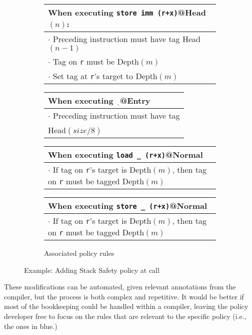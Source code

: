 \documentclass{report}
\begin{document}
\begin{figure}
\begin{subfigure}{\textwidth}
    \begin{tabular}{|l|}
      \hline
      When executing {\tt store imm (r+x)}@{\sc Head}\((n)\): \\
      \hline
      \rowcolor{red!20}
      \(\cdot\) Preceding instruction must have tag {\sc Head}\((n-1)\) \\
      \rowcolor{blue!30}
      \(\cdot\) Tag on {\tt r} must be {\sc Depth}\((m)\) \\
      \rowcolor{blue!30}
      \(\cdot\) Set tag at {\tt r}'s target to {\sc Depth}\((m)\) \\
      \hline
    \end{tabular}
    \begin{tabular}{|l|}
      \hline
      When executing \(\underline{~~}\)@{\sc Entry} \\
      \hline
      \rowcolor{red!20}
      \(\cdot\) Preceding instruction must have tag \\
      \rowcolor{red!20} {\sc Head}\((size / 8)\) \\
      \hline
    \end{tabular}
    
    \begin{tabular}{|l|}
      \hline
      When executing {\tt load \_ (r+x)}@{\sc Normal} \\
      \hline
      \rowcolor{blue!30}
      \(\cdot\) If tag on {\tt r}'s target is {\sc Depth}\((m)\), then
      tag on {\tt r} must be tagged {\sc Depth}\((m)\) \\
      \hline
    \end{tabular}
    
    \begin{tabular}{|l|}
      \hline
      When executing {\tt store \_ (r+x)}@{\sc Normal} \\
      \hline
      \rowcolor{blue!30}
      \(\cdot\) If tag on {\tt r}'s target is {\sc Depth}\((m)\), then
      tag on {\tt r} must be tagged {\sc Depth}\((m)\) \\
      \hline
    \end{tabular}
    \caption{Associated policy rules}
    \label{ex:call3}
  \end{subfigure}

  \caption{Example: Adding Stack Safety policy at call}
  \label{ex:call}
\end{figure}

These modifications can be automated, given relevant annotations from the compiler, but the process
is both complex and repetitive. It would be better if most of the bookkeeping could be handled
within a compiler, leaving the policy developer free to focus on the rules that are relevant to
the specific policy (i.e., the ones in blue.)
\end{document}
